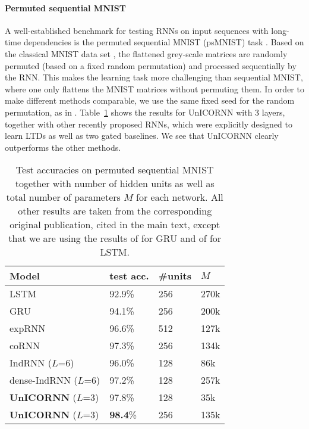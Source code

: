 \documentclass{article}
\newcommand{\Tref}[1]{Table~\ref{#1}}
\begin{document}
\paragraph{Permuted sequential MNIST}
A well-established benchmark for testing RNNs on input sequences with long-time dependencies is the permuted sequential MNIST (psMNIST) task \citep{seq_mnist}. Based on the classical MNIST data set \citep{mnist}, the flattened grey-scale matrices are randomly permuted (based on a fixed random permutation) and processed sequentially by the RNN. This makes the learning task more challenging than sequential MNIST, where one only flattens the MNIST matrices without permuting them. In order to make different methods comparable, we use the same fixed seed for the random permutation, as in \cite{exprnn,dtriv,scornn}. \Tref{tab:psmnist} shows the results for UnICORNN with $3$ layers, together with other recently proposed RNNs, which were explicitly designed to learn LTDs as well as two gated baselines. We see that UnICORNN clearly outperforms the other methods.
\begin{table}[ht]
\caption{Test accuracies on permuted sequential MNIST together with number of hidden units as well as total number of parameters $M$ for each network. All other results are taken from the corresponding original publication, cited in the main text, except that we are using the results of \cite{GRU_results} for GRU and of \cite{scornn} for LSTM.}
\label{tab:psmnist}
\vskip 0.15in
\begin{center}
\begin{small}
\begin{sc}
\begin{tabular}{llll}
\toprule
Model     & test acc. & \#units & $M$ \\
\midrule
LSTM & 92.9\% & 256 & 270k\\
GRU & 94.1\% & 256 & 200k\\
expRNN & 96.6\%  & 512 & 127k\\
coRNN  & 97.3\% & 256 & 134k \\
IndRNN ($L$=6)  & 96.0\% & 128 & 86k\\
dense-IndRNN ($L$=6) & 97.2\% & 128 & 257k \\
\textbf{UnICORNN} ($L$=3) & 97.8\% & 128 & 35k\\
\textbf{UnICORNN} ($L$=3) & \textbf{98.4}\% & 256 & 135k\\
\bottomrule
\end{tabular}
\end{sc}
\end{small}
\end{center}
\vskip -0.1in
\end{table}
\end{document}
